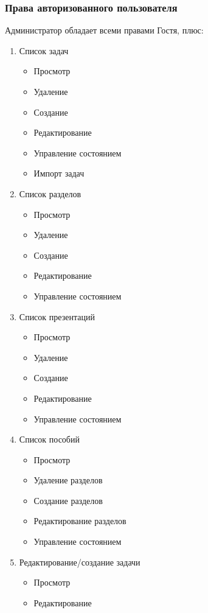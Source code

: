\subsubsection{Права авторизованного пользователя}
Администратор обладает всеми правами Гостя, плюс:
\begin{enumerate}
  \item Список задач
  \begin{itemize}
    \item Просмотр
    \item Удаление
    \item Создание
    \item Редактирование
    \item Управление состоянием
    \item Импорт задач
  \end{itemize}

  \item Список разделов
  \begin{itemize}
    \item Просмотр
    \item Удаление
    \item Создание
    \item Редактирование
    \item Управление состоянием
  \end{itemize}

  \item Список презентаций
  \begin{itemize}
    \item Просмотр
    \item Удаление
    \item Создание
    \item Редактирование
    \item Управление состоянием
  \end{itemize}

  \item Список пособий
  \begin{itemize}
    \item Просмотр
    \item Удаление разделов
    \item Создание разделов
    \item Редактирование разделов
    \item Управление состоянием
  \end{itemize}

  \item Редактирование/создание задачи
  \begin{itemize}
    \item Просмотр
    \item Редактирование
  \end{itemize}


\end{enumerate}
